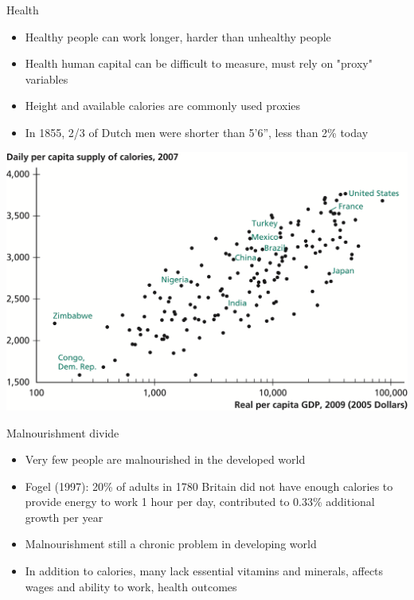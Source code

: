 \documentclass[10pt]{beamer}
\begin{document}
\begin{frame}[label={sec:orgb62c89d}]{}
\alert{Health}
\begin{itemize}
\item Healthy people can work longer, harder than unhealthy people
\item Health human capital can be difficult to measure, must rely on "proxy" variables
\item Height and available calories are commonly used proxies
\item In 1855, 2/3 of Dutch men were shorter than 5'6'', less than 2\% today
\end{itemize}
\end{frame}

\begin{frame}[label={sec:org0158144}]{}
\begin{center}
\includegraphics[width=.75\textwidth]{./img/6.1.png}
\end{center}
\end{frame}

\begin{frame}[label={sec:orga4c21fc}]{}
\alert{Malnourishment divide}
\begin{itemize}
\item Very few people are malnourished in the developed world
\item Fogel (1997): 20\% of adults in 1780 Britain did not have enough calories to provide energy to work 1 hour per day, contributed to 0.33\% additional growth per year
\item Malnourishment still a chronic problem in developing world
\item In addition to calories, many lack essential vitamins and minerals, affects wages and ability to work, health outcomes
\end{itemize}
\end{frame}
\end{document}

